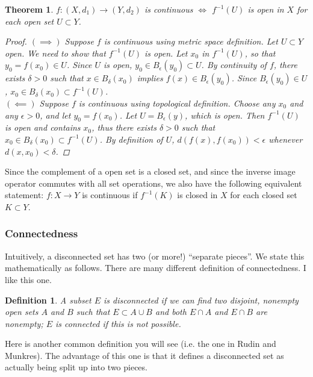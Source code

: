 \documentclass[10pt]{article}         %
\newtheorem{definition}{Definition}[section]
\newtheorem{theorem}{Theorem}[section]
\theoremstyle{remark}
\begin{document}
\begin{theorem}
$f: (X, d_1) \rightarrow (Y, d_2)$ is continuous $\iff$ $f^{-1}(U)$ is open in $X$ for each open set $U \subset Y$.
\begin{proof}
$(\implies)$ Suppose $f$ is continuous using metric space definition. Let $U \subset Y$ open. We need to show that $f^{-1}(U)$ is open. Let $x_0$ in $f^{-1}(U)$, so that $y_0 = f(x_0) \in U$. Since $U$ is open, $y_0 \in B_\epsilon(y_0) \subset U$. By continuity of $f$, there exists $\delta > 0$ such that $x \in B_\delta(x_0)$ implies $f(x) \in B_\epsilon(y_0)$. Since $B_\epsilon(y_0) \in U$, $x_0 \in B_\delta(x_0) \subset f^{-1}(U)$.\\
$(\impliedby)$ Suppose $f$ is continuous using topological definition. Choose any $x_0$ and any $\epsilon > 0$, and let $y_0 = f(x_0)$. Let $U = B_\epsilon(y)$, which is open. Then $f^{-1}(U)$ is open and contains $x_0$, thus there exists $\delta > 0$ such that $x_0 \in B_\delta(x_0) \subset f^{-1}(U)$. By definition of $U$, $d(f(x), f(x_0)) < \epsilon$ whenever $d(x, x_0) < \delta$.
\end{proof}
\end{theorem}

Since the complement of a open set is a closed set, and since the inverse image operator commutes with all set operations, we also have the following equivalent statement: $f: X \rightarrow Y$ is continuous if $f^{-1}(K)$ is closed in $X$ for each closed set $K \subset Y$.

\subsubsection{Connectedness}

Intuitively, a disconnected set has two (or more!) ``separate pieces''. We state this mathematically as follows. There are many different definition of connectedness. I like this one.

\begin{definition}
A subset $E$ is disconnected if we can find two disjoint, nonempty open sets $A$ and $B$ such that $E \subset A \cup B$ and both $E \cap A$ and $E \cap B$ are nonempty; $E$ is connected if this is not possible.
\end{definition}

Here is another common definition you will see (i.e. the one in Rudin and Munkres). The advantage of this one is that it defines a disconnected set as actually being split up into two pieces. 
\end{document}
